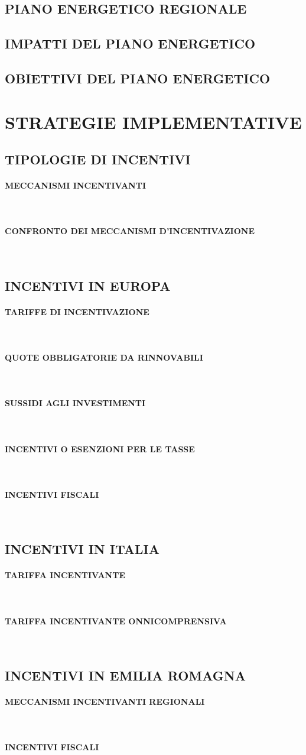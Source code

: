 \documentclass[12pt,a4paper,openright,twoside]{report}
\newcommand{\myparagraph}[1]{\paragraph{#1}\mbox{}\\}
\begin{document}
\subsection[PIANO REGIONALE]{\nohyphens{PIANO ENERGETICO REGIONALE}}

\subsection[IMPATTI PIANO]{\nohyphens{IMPATTI DEL PIANO ENERGETICO}}

\subsection[OBIETTIVI PIANO]{\nohyphens{OBIETTIVI DEL PIANO ENERGETICO}}



\section{\nohyphens{STRATEGIE IMPLEMENTATIVE}}

\subsection[INCENTIVI]{\nohyphens{TIPOLOGIE DI INCENTIVI}}

\myparagraph{MECCANISMI INCENTIVANTI}

\myparagraph{CONFRONTO DEI MECCANISMI D'INCENTIVAZIONE}

\subsection[INCENTIVI EUROPEI]{\nohyphens{INCENTIVI IN EUROPA}}

\myparagraph{TARIFFE DI INCENTIVAZIONE}

\myparagraph{QUOTE OBBLIGATORIE DA RINNOVABILI}

\myparagraph{SUSSIDI AGLI INVESTIMENTI}

\myparagraph{INCENTIVI O ESENZIONI PER LE TASSE}

\myparagraph{INCENTIVI FISCALI}


\subsection[INCENTIVI ITALIANI]{\nohyphens{INCENTIVI IN ITALIA}}

\myparagraph{TARIFFA INCENTIVANTE}

\myparagraph{TARIFFA INCENTIVANTE ONNICOMPRENSIVA}

\subsection[INCENTIVI REGIONALI]{\nohyphens{INCENTIVI IN EMILIA ROMAGNA}}

\myparagraph{MECCANISMI INCENTIVANTI REGIONALI}

\myparagraph{INCENTIVI FISCALI}


\nocite{*}


\end{document}

